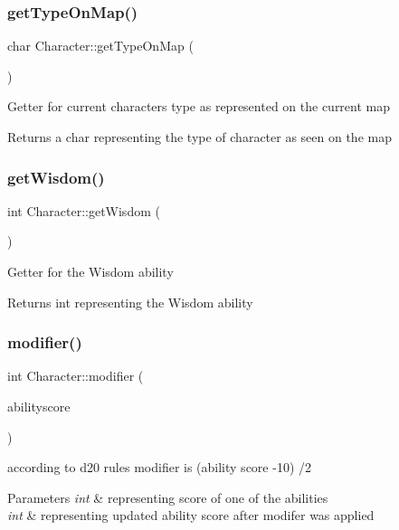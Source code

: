 \subsubsection{\texorpdfstring{get\+Type\+On\+Map()}{getTypeOnMap()}}
{\footnotesize\ttfamily char Character\+::get\+Type\+On\+Map (\begin{DoxyParamCaption}{ }\end{DoxyParamCaption})}

Getter for current character\textquotesingle{}s type as represented on the current map \begin{DoxyReturn}{Returns}
a char representing the type of character as seen on the map 
\end{DoxyReturn}
\hypertarget{classCharacter_a4d4d5548ed8ed813e4f59f123180afcb}{}\label{classCharacter_a4d4d5548ed8ed813e4f59f123180afcb} 
\subsubsection{\texorpdfstring{get\+Wisdom()}{getWisdom()}}
{\footnotesize\ttfamily int Character\+::get\+Wisdom (\begin{DoxyParamCaption}{ }\end{DoxyParamCaption})}

Getter for the Wisdom ability \begin{DoxyReturn}{Returns}
int representing the Wisdom ability 
\end{DoxyReturn}
\hypertarget{classCharacter_a54374ab71aec1bc86805b6f8aa7e7567}{}\label{classCharacter_a54374ab71aec1bc86805b6f8aa7e7567} 
\subsubsection{\texorpdfstring{modifier()}{modifier()}}
{\footnotesize\ttfamily int Character\+::modifier (\begin{DoxyParamCaption}\item[{int}]{abilityscore }\end{DoxyParamCaption})}

according to d20 rules modifier is (ability score -\/10) /2 
\begin{DoxyParams}{Parameters}
{\em int} & representing score of one of the abilities \\
\hline
{\em int} & representing updated ability score after modifer was applied \\
\hline
\end{DoxyParams}
\hypertarget{classCharacter_a74d1c28e2a5a4a3618c1f6c54c74fde4}{}\label{classCharacter_a74d1c28e2a5a4a3618c1f6c54c74fde4} 

